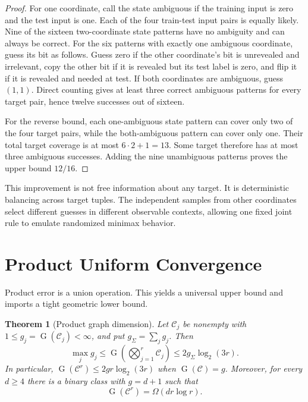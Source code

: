 \documentclass[twoside]{article}
\newtheorem{theorem}{Theorem}
\newcommand{\G}{\operatorname{G}}
\newcommand{\cC}{\mathcal C}
\begin{document}
\begin{proof}
For one coordinate, call the state ambiguous if the training input is zero and the test input is one. Each of the four train-test input pairs is equally likely. Nine of the sixteen two-coordinate state patterns have no ambiguity and can always be correct. For the six patterns with exactly one ambiguous coordinate, guess its bit as follows. Guess zero if the other coordinate's bit is unrevealed and irrelevant, copy the other bit if it is revealed but its test label is zero, and flip it if it is revealed and needed at test. If both coordinates are ambiguous, guess $(1,1)$. Direct counting gives at least three correct ambiguous patterns for every target pair, hence twelve successes out of sixteen.

For the reverse bound, each one-ambiguous state pattern can cover only two of the four target pairs, while the both-ambiguous pattern can cover only one. Their total target coverage is at most $6\cdot2+1=13$. Some target therefore has at most three ambiguous successes. Adding the nine unambiguous patterns proves the upper bound $12/16$.
\end{proof}

This improvement is not free information about any target. It is deterministic balancing across target tuples. The independent samples from other coordinates select different guesses in different observable contexts, allowing one fixed joint rule to emulate randomized minimax behavior.

\section{Product Uniform Convergence}

Product error is a union operation. This yields a universal upper bound and imports a tight geometric lower bound.

\begin{theorem}[Product graph dimension]\label{thm:graph}
Let $\cC_j$ be nonempty with $1\leq g_j=\G(\cC_j)<\infty$, and put $g_\Sigma=\sum_jg_j$. Then \[ \max_jg_j\leq\G\!\left(\bigotimes_{j=1}^r\cC_j\right)\leq2g_\Sigma\log_2(3r). \] In particular, $\G(\cC^r)\leq2gr\log_2(3r)$ when $\G(\cC)=g$. Moreover, for every $d\geq4$ there is a binary class with $g=d+1$ such that \[ \G(\cC^r)=\Omega(dr\log r). \]
\end{theorem}
\end{document}
